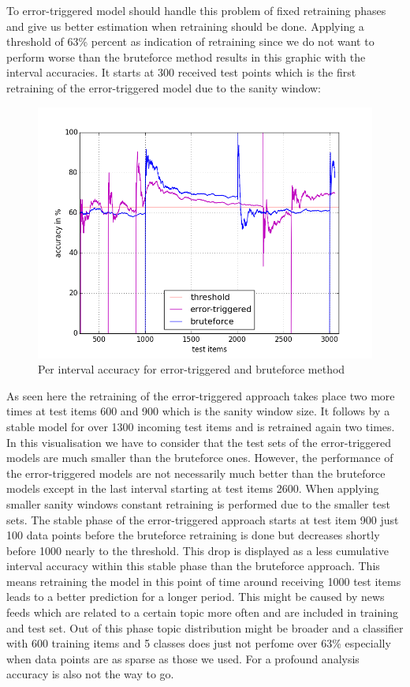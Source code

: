 \documentclass{article} %
\begin{document}
To error-triggered model should handle this problem of fixed retraining phases and give us better estimation when retraining should be done. Applying a threshold of 63\% percent as indication of retraining since we do not want to perform worse than the bruteforce method results in this graphic with the interval accuracies. It starts at 300 received test points which is the first retraining of the error-triggered model due to the sanity window:
 \begin{figure}[htbp]
  \centering
  \includegraphics[scale=0.5]{./plots/errortriggered_bruteforce.png}
  \caption{Per interval accuracy for error-triggered and bruteforce method}
\end{figure}

As seen here the retraining of the error-triggered approach takes place two more times at test items 600 and 900 which is the sanity window size. It  follows by a stable model for over 1300 incoming test items and is retrained again two times. In this visualisation we have to consider that the test sets of the error-triggered models are much smaller than the bruteforce ones. However, the performance of the error-triggered models are not necessarily much better than the bruteforce models except in the last interval starting at test items 2600. When applying smaller sanity windows constant retraining is performed due to the smaller test sets. The stable phase of the error-triggered approach starts at test item 900 just 100 data points before the bruteforce retraining is done but decreases shortly before 1000 nearly to the threshold. This drop is displayed as a less cumulative interval accuracy within this stable phase than the bruteforce approach. This means retraining the model in this point of time around receiving 1000 test items leads to a better prediction for a longer period. This might be caused by news feeds which are related to a certain topic more often and are included in training and test set. Out of this phase topic distribution might be broader and a classifier with 600 training items and 5 classes does just not perfome over 63\% especially when data points are as sparse as those we used. For a profound analysis accuracy is also not the way to go.  
\end{document}
